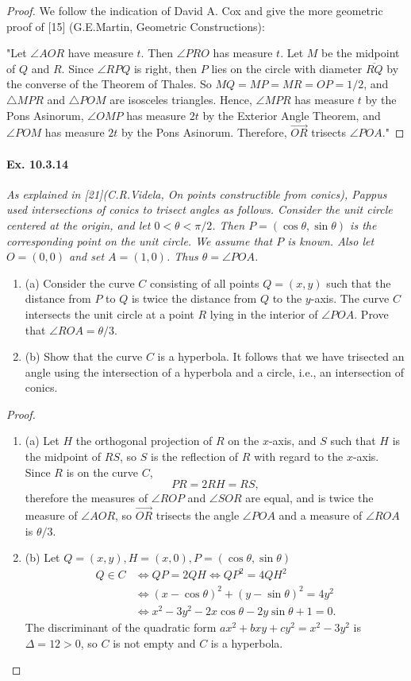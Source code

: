 \documentclass[11pt,a4paper]{article}
\newcommand{\be} {\begin{enumerate}}
\newcommand{\ee} {\end{enumerate}}
\begin{document}
\begin{proof}
We follow the indication of David A. Cox and give the more geometric proof of [15] (G.E.Martin, Geometric Constructions):

"Let $\angle AOR$ have measure $t$. Then $\angle PRO$ has measure $t$. Let $M$ be the midpoint of $Q$ and $R$. Since $\angle RPQ$ is right, then $P$ lies on the circle with diameter $\overline{RQ}$ by the converse of the Theorem of Thales. So $MQ = MP = MR = OP = 1/2$, and $\triangle MPR$ and $\triangle POM$ are isosceles triangles. Hence, $\angle MPR$ has measure $t$ by the Pons Asinorum, $\angle OMP$ has measure $2t$ by the Exterior Angle Theorem, and $\angle POM$ has measure $2t$ by the Pons Asinorum. Therefore, $\overrightarrow{OR}$ trisects $\angle POA$."
\end{proof}

\paragraph{Ex. 10.3.14}

{\it As explained in [21](C.R.Videla, {\it On points constructible from conics}), Pappus used intersections of conics to trisect angles as follows. Consider the unit circle centered at the origin, and let $0<\theta < \pi/2$. Then $P = (\cos \theta, \sin \theta)$ is the corresponding point on the unit circle. We assume that $P$ is known. Also let $O =(0,0)$ and set $A = (1,0)$. Thus $\theta = \angle POA$.
\be
\item[(a)] Consider the curve $C$ consisting of all points $Q = (x,y)$ such that the distance from $P$ to $Q$ is twice the distance from $Q$ to the $y$-axis. The curve $C$ intersects the unit circle at a point $R$ lying in the interior of $\angle POA$. Prove that $\angle ROA = \theta/3$.
\item[(b)] Show that the curve $C$ is a hyperbola. It follows that we have trisected an angle using the intersection of a hyperbola and a circle, i.e., an intersection of conics.
\ee
}

\begin{proof}
\be
\item[(a)]
Let $H$ the orthogonal projection of $R$ on the $x$-axis, and $S$ such that $H$ is the midpoint  of $RS$, so $S$ is the reflection of $R$ with regard to the $x$-axis. Since $R$ is on the curve $C$,
$$PR = 2 RH = RS,$$
therefore the measures of $\angle ROP$ and $\angle SOR$ are equal, and is twice the measure of $\angle AOR$, so $\overrightarrow{OR}$ trisects the angle $\angle POA$ and a measure of $\angle ROA$ is $\theta/3$.

\item[(b)] Let $Q=(x,y), H = (x,0), P = (\cos \theta, \sin \theta)$
\begin{align*}
Q \in C &\iff QP = 2 QH \iff QP^2 = 4 QH^2\\
&\iff(x- \cos \theta)^2 + (y-\sin \theta)^2 = 4 y^2\\
& \iff x^2 - 3 y^2  - 2 x \cos \theta  - 2 y \sin \theta +1 = 0.
\end{align*}
The discriminant of the quadratic form $a x^2 + bxy + cy^2 = x^2-3y^2$ is $\Delta = 12>0$, so $C$ is not empty and $C$ is a hyperbola.
\ee
\end{proof}
\end{document}
